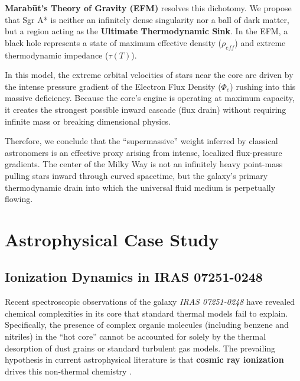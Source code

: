\documentclass[11pt, a4paper]{article}
\begin{document}
  \textbf{Marab\={u}t's Theory of Gravity (EFM)} resolves this dichotomy. We propose that Sgr A* is neither an infinitely dense singularity nor a ball of dark matter, but a region acting as the \textbf{Ultimate Thermodynamic Sink}. In the EFM, a black hole represents a state of maximum effective density ($\rho_{eff}$) and extreme thermodynamic impedance ($\tau(T)$). 

  In this model, the extreme orbital velocities of stars near the core are driven by the intense pressure gradient of the Electron Flux Density ($\Phi_e$) rushing into this massive deficiency. Because the core's engine is operating at maximum capacity, it creates the strongest possible inward cascade (flux drain) without requiring infinite mass or breaking dimensional physics. 

  Therefore, we conclude that the ``supermassive'' weight inferred by classical astronomers is an effective proxy arising from intense, localized flux-pressure gradients. The center of the Milky Way is not an infinitely heavy point-mass pulling stars inward through curved spacetime, but the galaxy's primary thermodynamic drain into which the universal fluid medium is perpetually flowing.

\clearpage
\section{Astrophysical Case Study}

\subsection{Ionization Dynamics in IRAS 07251-0248}

Recent spectroscopic observations of the galaxy \textit{IRAS 07251-0248} have revealed chemical complexities in its core that standard thermal models fail to explain. Specifically, the presence of complex organic molecules (including benzene and nitriles) in the ``hot core'' cannot be accounted for solely by the thermal desorption of dust grains or standard turbulent gas models. The prevailing hypothesis in current astrophysical literature is that \textbf{cosmic ray ionization} drives this non-thermal chemistry \cite{garcia2026, speranza2025}.
\end{document}
